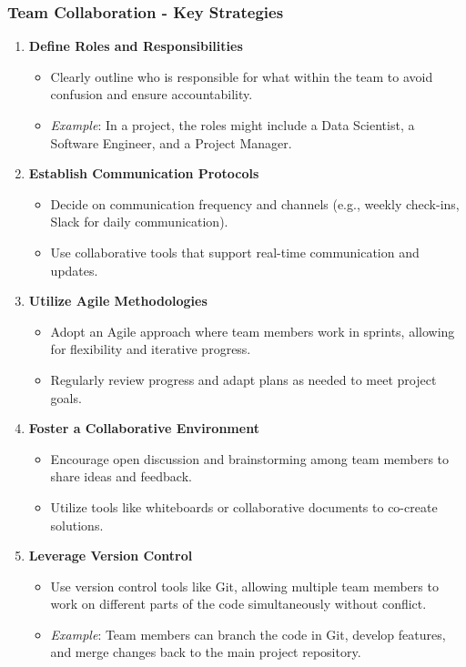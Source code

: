 \documentclass{beamer}
\begin{document}
\begin{frame}[fragile]
    \frametitle{Team Collaboration - Key Strategies}
    \begin{enumerate}
        \item \textbf{Define Roles and Responsibilities}
        \begin{itemize}
            \item Clearly outline who is responsible for what within the team to avoid confusion and ensure accountability.
            \item \textit{Example}: In a project, the roles might include a Data Scientist, a Software Engineer, and a Project Manager.
        \end{itemize}
        
        \item \textbf{Establish Communication Protocols}
        \begin{itemize}
            \item Decide on communication frequency and channels (e.g., weekly check-ins, Slack for daily communication).
            \item Use collaborative tools that support real-time communication and updates.
        \end{itemize}
        
        \item \textbf{Utilize Agile Methodologies}
        \begin{itemize}
            \item Adopt an Agile approach where team members work in sprints, allowing for flexibility and iterative progress.
            \item Regularly review progress and adapt plans as needed to meet project goals.
        \end{itemize}
        
        \item \textbf{Foster a Collaborative Environment}
        \begin{itemize}
            \item Encourage open discussion and brainstorming among team members to share ideas and feedback.
            \item Utilize tools like whiteboards or collaborative documents to co-create solutions.
        \end{itemize}

        \item \textbf{Leverage Version Control}
        \begin{itemize}
            \item Use version control tools like Git, allowing multiple team members to work on different parts of the code simultaneously without conflict.
            \item \textit{Example}: Team members can branch the code in Git, develop features, and merge changes back to the main project repository.
        \end{itemize}
    \end{enumerate}
\end{frame}
\end{document}
